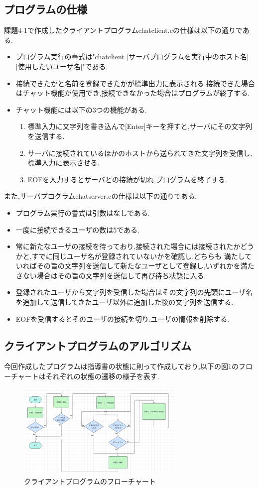 \documentclass[dvipdfmx]{jarticle}
\begin{document}
\subsection{プログラムの仕様}
課題4-1で作成したクライアントプログラムchatclient.cの仕様は以下の通りである.
\begin{itemize}
    \item プログラム実行の書式は"chatclient [サーバプログラムを実行中のホスト名] [使用したいユーザ名]"である.
    \item 接続できたかと名前を登録できたかが標準出力に表示される.接続できた場合はチャット機能が使用でき,接続できなかった場合はプログラムが終了する.
    \item チャット機能には以下の3つの機能がある.
    \begin{enumerate}
        \item 標準入力に文字列を書き込んで[Enter]キーを押すと,サーバにその文字列を送信する.
        \item サーバに接続されているほかのホストから送られてきた文字列を受信し,標準入力に表示させる.
        \item EOFを入力するとサーバとの接続が切れ,プログラムを終了する.
    \end{enumerate}
\end{itemize}
また,サーバプログラムchatserver.cの仕様は以下の通りである.
\begin{itemize}
    \item プログラム実行の書式は引数はなしである.
    \item 一度に接続できるユーザの数は5である.
    \item 常に新たなユーザの接続を待っており,接続された場合には接続されたかどうかと,すでに同じユーザ名が登録されていないかを確認し,どちらも
    満たしていればその旨の文字列を送信して新たなユーザとして登録し,いずれかを満たさない場合はその旨の文字列を送信して再び待ち状態に入る.
    \item 登録されたユーザから文字列を受信した場合はその文字列の先頭にユーザ名を追加して送信してきたユーザ以外に追加した後の文字列を送信する.
    \item EOFを受信するとそのユーザの接続を切り,ユーザの情報を削除する.
\end{itemize}
\subsection{クライアントプログラムのアルゴリズム}
今回作成したプログラムは指導書の状態に則って作成しており,以下の図1のフローチャートはそれぞれの状態の遷移の様子を表す.
\begin{figure}[h]
    \centering
    \includegraphics[width=8cm]{4-1clienthurotya.png}
    \caption{クライアントプログラムのフローチャート}
\end{figure}
\end{document}
